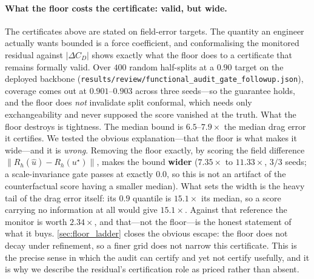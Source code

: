 \paragraph{What the floor costs the certificate: valid, but wide.} The certificates above
are stated on field-error targets. The quantity an engineer actually wants bounded is a
force coefficient, and conformalising the monitored residual against $|\Delta C_D|$ shows
exactly what the floor does to a certificate that remains formally valid. Over $400$
random half-splits at a $0.90$ target on the deployed backbone
(\texttt{results/review/functional\_audit\_gate\_followup.json}), coverage comes out at
$0.901$--$0.903$ across three seeds---so the guarantee holds, and the floor does
\emph{not} invalidate split conformal, which needs only exchangeability and never
supposed the score vanished at the truth. What the floor destroys is tightness. The median
bound is $\mathbf{6.5}$--$\mathbf{7.9\times}$ the median drag error it certifies. We
tested the obvious explanation---that the floor is what makes it wide---and it is
\emph{wrong}. Removing the floor exactly, by scoring the field difference
$\|R_h(\hat u)-R_h(u^\star)\|$, makes the bound \textbf{wider} ($7.35\times$ to
$11.33\times$, $3/3$ seeds; a scale-invariance gate passes at exactly $0.0$, so this is
not an artifact of the counterfactual score having a smaller median). What sets the
width is the heavy tail of the drag error itself: its $0.9$ quantile is $15.1\times$ its
median, so a score carrying no information at all would give $15.1\times$. Against that
reference the monitor is worth $\mathbf{2.34\times}$, and that---not the floor---is the
honest statement of what it buys. \autoref{sec:floor_ladder} closes the obvious escape: the
floor does not decay under refinement, so a finer grid does not narrow this certificate.
This is the precise sense in which the audit can certify and yet not
certify usefully, and it is why we describe the residual's certification role as priced
rather than absent.
